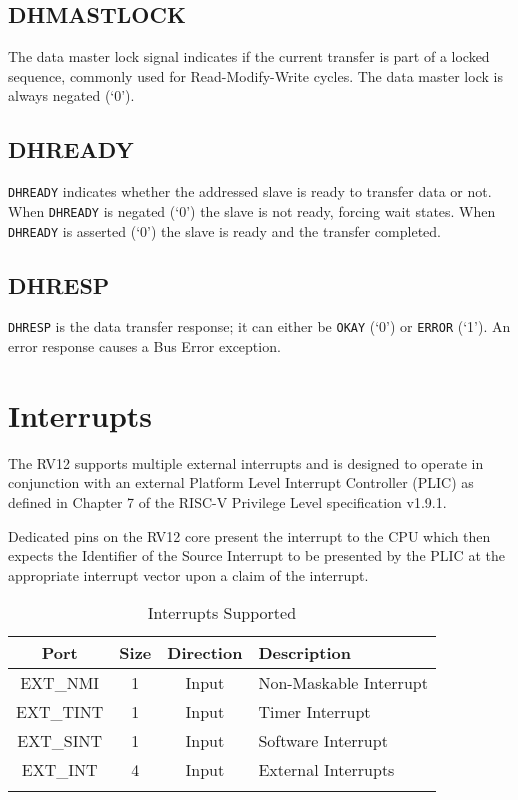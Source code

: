 \subsection{DHMASTLOCK}\label{dhmastlock}

The data master lock signal indicates if the current transfer is part of
a locked sequence, commonly used for Read-Modify-Write cycles. The data
master lock is always negated (`0').

\subsection{DHREADY}\label{dhready}

\texttt{DHREADY} indicates whether the addressed slave is ready to transfer data
or not. When \texttt{DHREADY} is negated (`0') the slave is not ready, forcing
wait states. When \texttt{DHREADY} is asserted (`0') the slave is ready and the
transfer completed.

\subsection{DHRESP}\label{dhresp}

\texttt{DHRESP} is the data transfer response; it can either be \texttt{OKAY} (`0') or
\texttt{ERROR} (`1'). An error response causes a Bus Error exception.

\section{Interrupts}\label{interrupts}

The RV12 supports multiple external interrupts and is designed to
operate in conjunction with an external Platform Level Interrupt
Controller (PLIC) as defined in Chapter 7 of the RISC-V Privilege Level
specification v1.9.1.

Dedicated pins on the RV12 core present the interrupt to the CPU which
then expects the Identifier of the Source Interrupt to be presented by
the PLIC at the appropriate interrupt vector upon a claim of the
interrupt.

\begin{longtable}[]{@{}cccl@{}}
\toprule
Port & Size & Direction & Description\tabularnewline
\midrule
\endhead
EXT\_NMI  & 1 & Input & Non-Maskable Interrupt\tabularnewline
EXT\_TINT & 1 & Input & Timer Interrupt\tabularnewline
EXT\_SINT & 1 & Input & Software Interrupt\tabularnewline
EXT\_INT  & 4 & Input & External Interrupts\tabularnewline
\bottomrule
\caption{Interrupts Supported}
\label{tab:int-support}
\end{longtable}

